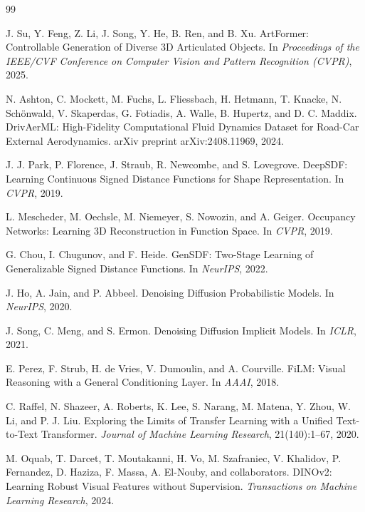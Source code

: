 \documentclass[10pt]{article}
\begin{document}
\begin{thebibliography}{99}

J. Su, Y. Feng, Z. Li, J. Song, Y. He, B. Ren, and B. Xu.
\newblock ArtFormer: Controllable Generation of Diverse 3D Articulated Objects.
\newblock In \emph{Proceedings of the IEEE/CVF Conference on Computer Vision and Pattern Recognition (CVPR)}, 2025.

N. Ashton, C. Mockett, M. Fuchs, L. Fliessbach, H. Hetmann, T. Knacke, N. Schönwald, V. Skaperdas, G. Fotiadis, A. Walle, B. Hupertz, and D. C. Maddix.
\newblock DrivAerML: High-Fidelity Computational Fluid Dynamics Dataset for Road-Car External Aerodynamics.
\newblock arXiv preprint arXiv:2408.11969, 2024.

J. J. Park, P. Florence, J. Straub, R. Newcombe, and S. Lovegrove.
\newblock DeepSDF: Learning Continuous Signed Distance Functions for Shape Representation.
\newblock In \emph{CVPR}, 2019.

L. Mescheder, M. Oechsle, M. Niemeyer, S. Nowozin, and A. Geiger.
\newblock Occupancy Networks: Learning 3D Reconstruction in Function Space.
\newblock In \emph{CVPR}, 2019.

G. Chou, I. Chugunov, and F. Heide.
\newblock GenSDF: Two-Stage Learning of Generalizable Signed Distance Functions.
\newblock In \emph{NeurIPS}, 2022.

J. Ho, A. Jain, and P. Abbeel.
\newblock Denoising Diffusion Probabilistic Models.
\newblock In \emph{NeurIPS}, 2020.

J. Song, C. Meng, and S. Ermon.
\newblock Denoising Diffusion Implicit Models.
\newblock In \emph{ICLR}, 2021.

E. Perez, F. Strub, H. de Vries, V. Dumoulin, and A. Courville.
\newblock FiLM: Visual Reasoning with a General Conditioning Layer.
\newblock In \emph{AAAI}, 2018.

C. Raffel, N. Shazeer, A. Roberts, K. Lee, S. Narang, M. Matena, Y. Zhou, W. Li, and P. J. Liu.
\newblock Exploring the Limits of Transfer Learning with a Unified Text-to-Text Transformer.
\newblock \emph{Journal of Machine Learning Research}, 21(140):1--67, 2020.

M. Oquab, T. Darcet, T. Moutakanni, H. Vo, M. Szafraniec, V. Khalidov, P. Fernandez, D. Haziza, F. Massa, A. El-Nouby, and collaborators.
\newblock DINOv2: Learning Robust Visual Features without Supervision.
\newblock \emph{Transactions on Machine Learning Research}, 2024.


\end{thebibliography}
\end{document}
